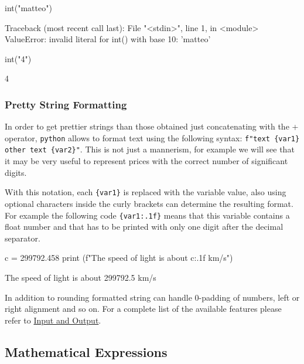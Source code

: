 \begin{ipython}
int("matteo")
\end{ipython}
\begin{ioutput}
Traceback (most recent call last):
  File "<stdin>", line 1, in <module>
ValueError: invalid literal for int() with base 10: 'matteo'
\end{ioutput}

\begin{ipython}
int("4") 
\end{ipython}
\begin{ioutput}
4
\end{ioutput}

\subsubsection{Pretty String Formatting}
In order to get prettier strings than those obtained just concatenating with the + operator, \texttt{python} allows to format text using the following syntax: \texttt{f"text \{var1\} other text \{var2\}"}.
This is not just a mannerism, for example we will see that it may be very useful to represent prices with the correct number of significant digits.

With this notation, each \texttt{\{var1\}} is replaced with the variable value, also using optional characters inside the curly brackets can determine the resulting format. For example the following code \texttt{\{var1:.1f\}} means that this variable contains a float number and that has to be printed with only one digit after the decimal separator. 

\begin{ipython}
c = 299792.458
print (f"The speed of light is about {c:.1f} km/s")	
\end{ipython}
\begin{ioutput}
The speed of light is about 299792.5 km/s
\end{ioutput}

In addition to rounding formatted string can handle 0-padding of numbers, left or right alignment and so on. For a complete list of the available features please refer to \href{https://docs.python.org/3/tutorial/inputoutput.html}{Input and Output}.

\subsection{Mathematical Expressions}\label{mathematical-expressions}


